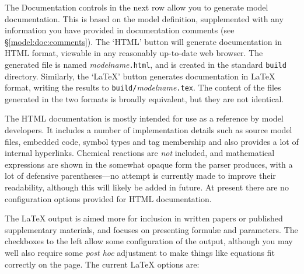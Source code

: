 \documentclass[a4paper,11pt]{article}
\begin{document}
The Documentation controls in the next row allow you to generate model documentation. This is based on the model definition, supplemented with any information you have provided in documentation comments (see \S\ref{model:doc:comments}). The `HTML' button will generate documentation in HTML format, viewable in any reasonably up-to-date web browser. The generated file is named \textit{modelname}\texttt{.html}, and is created in the standard \texttt{build} directory. Similarly, the `LaTeX' button generates documentation in \LaTeX{} format, writing the results to \texttt{build/}\textit{modelname}\texttt{.tex}. The content of the files generated in the two formats is broadly equivalent, but they are not identical.

The HTML documentation is mostly intended for use as a reference by model developers. It includes a number of implementation details such as source model files, embedded code, symbol types and tag membership and also provides a lot of internal hyperlinks. Chemical reactions are \textit{not} included, and mathematical expressions are shown in the somewhat opaque form the parser produces, with a lot of defensive parentheses---no attempt is currently made to improve their readability, although this will likely be added in future. At present there are no configuration options provided for HTML documentation.

The \LaTeX{} output is aimed more for inclusion in written papers or published supplementary materials, and focuses on presenting formul\ae{} and parameters. The checkboxes to the left allow some configuration of the output, although you may well also require some \textit{post hoc} adjustment to make things like equations fit correctly on the page. The current \LaTeX{} options are:
\end{document}
